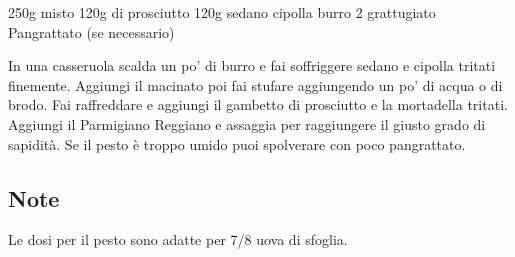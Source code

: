 \begin{ingreds}
	250g  misto
	120g  di prosciutto
	120g 
	sedano
	cipolla
	burro
	2 
	 grattugiato
	Pangrattato (se necessario)

\end{ingreds}

\begin{method}
In una casseruola scalda un po' di burro e fai soffriggere sedano e cipolla tritati finemente. Aggiungi il macinato poi fai stufare aggiungendo un po' di acqua o di brodo. Fai raffreddare e aggiungi il gambetto di prosciutto e la mortadella tritati. Aggiungi il Parmigiano Reggiano e assaggia per raggiungere il giusto grado di sapidità. Se il pesto è troppo umido puoi spolverare con poco pangrattato.


\end{method}

\subsection*{Note}
Le dosi per il pesto sono adatte per 7/8 uova di sfoglia.




